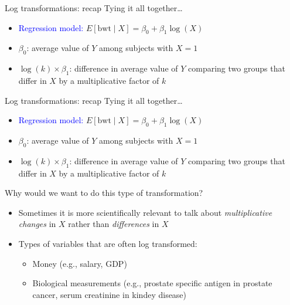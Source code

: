\documentclass[10pt,t]{beamer}
\begin{document}
\begin{frame}{Log transformations: recap}
Tying it all together\dots

\vspace{0.3cm}

\begin{itemize}
	\item \textcolor{blue}{Regression model:} $E[\text{bwt} \mid X] = \beta_0 + \beta_1 \log(X)$
	\item \color{blue} $\beta_0$\color{black}: average value of $Y$ among subjects with $X = 1$
	\item \color{blue}$\log(k) \times \beta_1$\color{black}: difference in average value of $Y$ comparing two groups that differ in $X$ by a multiplicative factor of $k$
\end{itemize}

\end{frame}

\begin{frame}{Log transformations: recap}
Tying it all together\dots

\vspace{0.3cm}

\begin{itemize}
	\item \textcolor{blue}{Regression model:} $E[\text{bwt} \mid X] = \beta_0 + \beta_1 \log(X)$
	\item \color{blue} $\beta_0$\color{black}: average value of $Y$ among subjects with $X = 1$
	\item \color{blue}$\log(k) \times \beta_1$\color{black}: difference in average value of $Y$ comparing two groups that differ in $X$ by a multiplicative factor of $k$
\end{itemize}

\vspace{0.3cm}

Why would we want to do this type of transformation?

\begin{itemize}
	\item Sometimes it is more scientifically relevant to talk about \textit{multiplicative changes} in $X$ rather than \textit{differences} in $X$
	\item Types of variables that are often log transformed:
	\begin{itemize}
		\item Money (e.g., salary, GDP)
		\item Biological measurements (e.g., prostate specific antigen in prostate cancer, serum creatinine in kindey disease)
	\end{itemize}
\end{itemize}
\end{frame}
\end{document}
